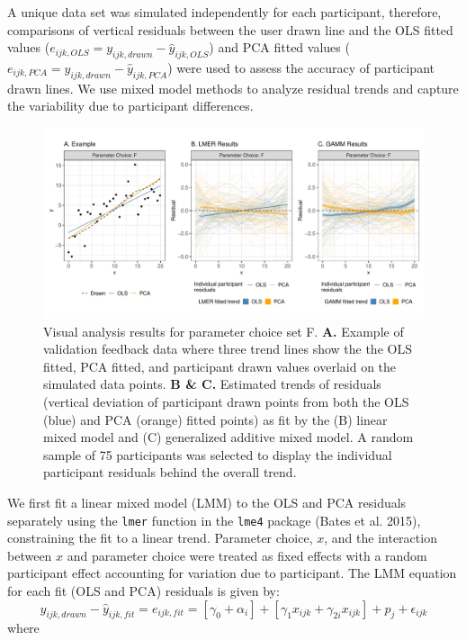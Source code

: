 \documentclass[
]{jds}
\begin{document}
A unique data set was simulated independently for each participant,
therefore, comparisons of vertical residuals between the user drawn line
and the OLS fitted values
(\(e_{ijk,OLS} = y_{ijk,drawn} - \hat y_{ijk,OLS}\)) and PCA fitted
values (\(e_{ijk,PCA} = y_{ijk,drawn} - \hat y_{ijk,PCA}\)) were used to
assess the accuracy of participant drawn lines. We use mixed model
methods to analyze residual trends and capture the variability due to
participant differences.

\begin{figure}

{\centering \includegraphics{./images/fig-eyefitting-plots-1.pdf}

}

\caption{\label{fig-eyefitting-plots}Visual analysis results for
parameter choice set F. \linebreak \textbf{A.} Example of validation
feedback data where three trend lines show the the OLS fitted, PCA
fitted, and participant drawn values overlaid on the simulated data
points. \linebreak \textbf{B \& C.} Estimated trends of residuals
(vertical deviation of participant drawn points from both the OLS (blue)
and PCA (orange) fitted points) as fit by the (B) linear mixed model and
(C) generalized additive mixed model. A random sample of 75 participants
was selected to display the individual participant residuals behind the
overall trend.}

\end{figure}

We first fit a linear mixed model (LMM) to the OLS and PCA residuals
separately using the \texttt{lmer} function in the \texttt{lme4} package
(Bates et al. 2015), constraining the fit to a linear trend. Parameter
choice, \(x\), and the interaction between \(x\) and parameter choice
were treated as fixed effects with a random participant effect
accounting for variation due to participant. The LMM equation for each
fit (OLS and PCA) residuals is given by: \begin{equation}
y_{ijk,drawn} - \hat y_{ijk,fit} = e_{ijk,fit} = \left[\gamma_0 + \alpha_i\right] + \left[\gamma_{1} x_{ijk} + \gamma_{2i} x_{ijk}\right] + p_{j} + \epsilon_{ijk}
\end{equation} \noindent where
\end{document}
